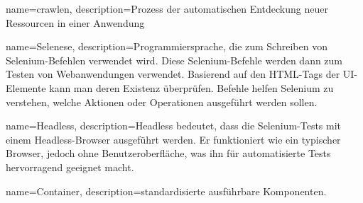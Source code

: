 {name=crawlen, description={Prozess der automatischen Entdeckung neuer Ressourcen in einer Anwendung}}

{name=Selenese, description={Programmiersprache, die zum Schreiben von Selenium-Befehlen verwendet wird. Diese Selenium-Befehle werden dann zum Testen von Webanwendungen verwendet. Basierend auf den HTML-Tags der UI-Elemente kann man deren Existenz \"uberpr\"ufen. Befehle helfen Selenium zu verstehen, welche Aktionen oder Operationen ausgef\"uhrt werden sollen.}}

{name=Headless, description={Headless bedeutet, dass die Selenium-Tests mit einem Headless-Browser ausgef\"uhrt werden. Er funktioniert wie ein typischer Browser, jedoch ohne Benutzeroberfl\"ache, was ihn f\"ur automatisierte Tests hervorragend geeignet macht.}}

{name=Container, description={standardisierte ausf\"uhrbare Komponenten.}}
